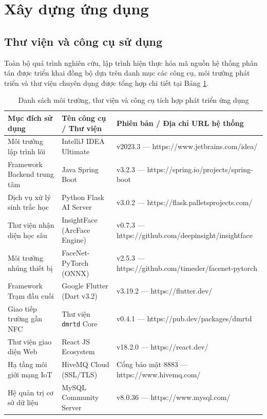 \documentclass[../DoAn.tex]{subfiles}
\begin{document}
\section{Xây dựng ứng dụng}
\label{section:4.3}

\subsection{Thư viện và công cụ sử dụng}

Toàn bộ quá trình nghiên cứu, lập trình hiện thực hóa mã nguồn hệ thống phân tán được triển khai đồng bộ dựa trên danh mục các công cụ, môi trường phát triển và thư viện chuyên dụng được tổng hợp chi tiết tại Bảng \ref{table:tools_development}.

\begin{table}[tbhp]
\centering
\small
\renewcommand{\arraystretch}{1.3}
\caption{Danh sách môi trường, thư viện và công cụ tích hợp phát triển ứng dụng}
\label{table:tools_development}
\begin{tabular}{|p{3.2cm}|p{4.2cm}|p{6.8cm}|}
\hline
\textbf{Mục đích sử dụng} & \textbf{Tên công cụ / Thư viện} & \textbf{Phiên bản / Địa chỉ URL hệ thống} \\
\hline
Môi trường lập trình lõi & IntelliJ IDEA Ultimate & v2023.3 — https://www.jetbrains.com/idea/ \\
\hline
Framework Backend trung tâm & Java Spring Boot & v3.2.3 — https://spring.io/projects/spring-boot \\
\hline
Dịch vụ xử lý sinh trắc học & Python Flask AI Server & v3.0.2 — https://flask.palletsprojects.com/ \\
\hline
Thư viện nhận diện học sâu & InsightFace (ArcFace Engine) & v0.7.3 — https://github.com/deepinsight/insightface \\
\hline
Môi trường nhúng thiết bị & FaceNet-PyTorch (ONNX) & v2.5.3 — https://github.com/timesler/facenet-pytorch \\
\hline
Framework Trạm đầu cuối & Google Flutter (Dart v3.2) & v3.19.2 — https://flutter.dev/ \\
\hline
Giao tiếp trường gần NFC & Thư viện \texttt{dmrtd} Core & v0.4.1 — https://pub.dev/packages/dmrtd \\
\hline
Thư viện giao diện Web & React JS Ecosystem & v18.2.0 — https://react.dev/ \\
\hline
Hạ tầng môi giới mạng IoT & HiveMQ Cloud (SSL/TLS) & Cổng bảo mật 8883 — https://www.hivemq.com/ \\
\hline
Hệ quản trị cơ sở dữ liệu & MySQL Community Server & v8.0.36 — https://www.mysql.com/ \\
\hline
\end{tabular}
\end{table}
\end{document}
